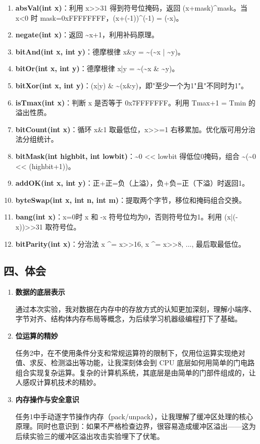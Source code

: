 \documentclass[12pt,a4paper]{ctexart}
\begin{document}
\begin{enumerate}[label=（\arabic*）,nosep]
    \item \textbf{absVal(int x)}：利用 x>>31 得到符号位掩码，返回 (x+mask)\^{}mask。当 x<0 时 mask=0xFFFFFFFF，(x+(-1))\^{}(-1) = (-x)。
    \item \textbf{negate(int x)}：返回 \~{}x+1，利用补码原理。
    \item \textbf{bitAnd(int x, int y)}：德摩根律 x\&y = \~{}(\~{}x | \~{}y)。
    \item \textbf{bitOr(int x, int y)}：德摩根律 x|y = \~{}(\~{}x \& \~{}y)。
    \item \textbf{bitXor(int x, int y)}：(x|y) \& \~{}(x\&y)，即"至少一个为1"且"不同时为1"。
    \item \textbf{isTmax(int x)}：判断 x 是否等于 0x7FFFFFFF。利用 Tmax+1 = Tmin 的溢出性质。
    \item \textbf{bitCount(int x)}：循环 x\&1 取最低位，x>>=1 右移累加。优化版可用分治法分组统计。
    \item \textbf{bitMask(int highbit, int lowbit)}：\~{}0 << lowbit 得低位0掩码，组合 \~{}(\~{}0 << (highbit+1))。
    \item \textbf{addOK(int x, int y)}：正+正=负（上溢），负+负=正（下溢）时返回1。
    \item \textbf{byteSwap(int x, int n, int m)}：提取两个字节，移位和掩码组合交换。
    \item \textbf{bang(int x)}：x=0时 x 和 -x 符号位均为0，否则符号位为1。利用 (x|(-x))>>31 取符号位。
    \item \textbf{bitParity(int x)}：分治法 x \^{}= x>>16, x \^{}= x>>8, ..., 最后取最低位。
\end{enumerate}

\subsection*{四、体会}

\begin{enumerate}[label=\arabic*.]
    \item \textbf{数据的底层表示}

    通过本次实验，我对数据在内存中的存放方式的认知更加深刻，理解小端序、字节对齐、结构体内存布局等概念，为后续学习机器级编程打下了基础。

    \item \textbf{位运算的精妙}

    任务2中，在不使用条件分支和常规运算符的限制下，仅用位运算实现绝对值、求反、检测溢出等功能，让我深刻体会到 CPU 底层如何用简单的门电路组合实现复杂运算。复杂的计算机系统，其底层是由简单的门部件组成的，让人感叹计算机技术的精妙。

    \item \textbf{内存操作与安全意识}

    任务1中手动逐字节操作内存（pack/unpack），让我理解了缓冲区处理的核心原理。同时也意识到：如果不严格检查边界，很容易造成缓冲区溢出——这为后续实验三的缓冲区溢出攻击实验埋下了伏笔。
\end{enumerate}
\end{document}
